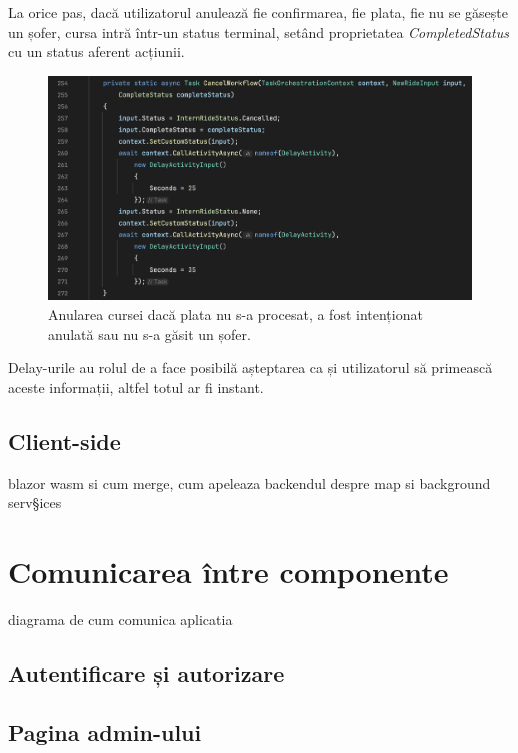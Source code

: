 La orice pas, dacă utilizatorul anulează fie confirmarea, fie plata, fie nu se găsește un șofer, cursa intră într-un status
terminal, setând proprietatea \textit{CompletedStatus} cu un status aferent acțiunii.
\begin{figure}[H]
    \centering
    \includegraphics[width=14cm]{Assets/cancelFlow.png}
    \caption{Anularea cursei dacă plata nu s-a procesat, a fost intenționat anulată sau nu s-a găsit un șofer.}
    \label{fig:cancelFlow}
\end{figure}
Delay-urile au rolul de a face posibilă așteptarea ca și utilizatorul să primească aceste informații, altfel totul ar fi instant.


\subsection{Client-side}
blazor wasm si cum merge, cum apeleaza backendul
despre map si background serv§ices
\section{Comunicarea între componente}
diagrama de cum comunica aplicatia
\subsection{Autentificare și autorizare}
\subsection{Pagina admin-ului}